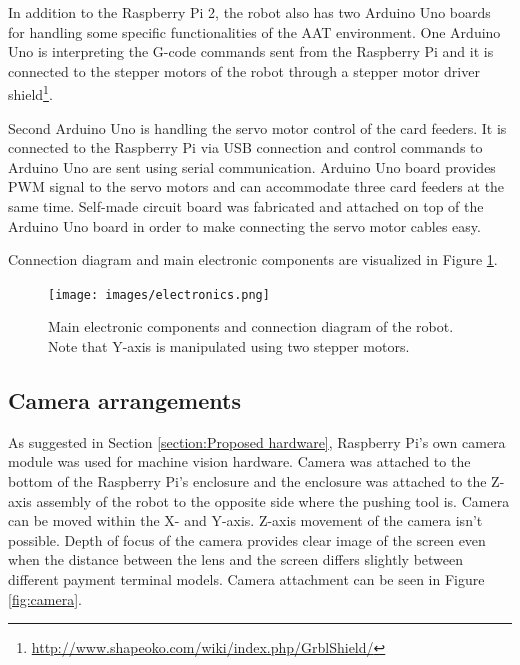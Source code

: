 In addition to the Raspberry Pi 2, the robot also has two Arduino Uno boards for handling some specific functionalities of the AAT environment. One Arduino Uno is interpreting the G-code commands sent from the Raspberry Pi and it is connected to the stepper motors of the robot through a stepper motor driver shield\footnote{\url{http://www.shapeoko.com/wiki/index.php/GrblShield/}}.

Second Arduino Uno is handling the servo motor control of the card feeders. It is connected to the Raspberry Pi via USB connection and control commands to Arduino Uno are sent using serial communication. Arduino Uno board provides PWM signal to the servo motors and can accommodate three card feeders at the same time. Self-made circuit board was fabricated and attached on top of the Arduino Uno board in order to make connecting the servo motor cables easy.

Connection diagram and main electronic components are visualized in Figure \ref{fig:electronics}.

\begin{figure}[ht]
  \begin{center}
    \texttt{[image: images/electronics.png]}
    \caption{Main electronic components and connection diagram of the robot. Note that Y-axis is manipulated using two stepper motors.}
    \label{fig:electronics}
  \end{center}
\end{figure}
\FloatBarrier

\subsection{Camera arrangements}
\label{subsection:Camera Arrangements}

As suggested in Section \ref{section:Proposed hardware}, Raspberry Pi's own camera module was used for machine vision hardware. Camera was attached to the bottom of the Raspberry Pi's enclosure and the enclosure was attached to the Z-axis assembly of the robot to the opposite side where the pushing tool is. Camera can be moved within the X- and Y-axis. Z-axis movement of the camera isn't possible. Depth of focus of the camera provides clear image of the screen even when the distance between the lens and the screen differs slightly between different payment terminal models. Camera attachment can be seen in Figure \ref{fig:camera}.

